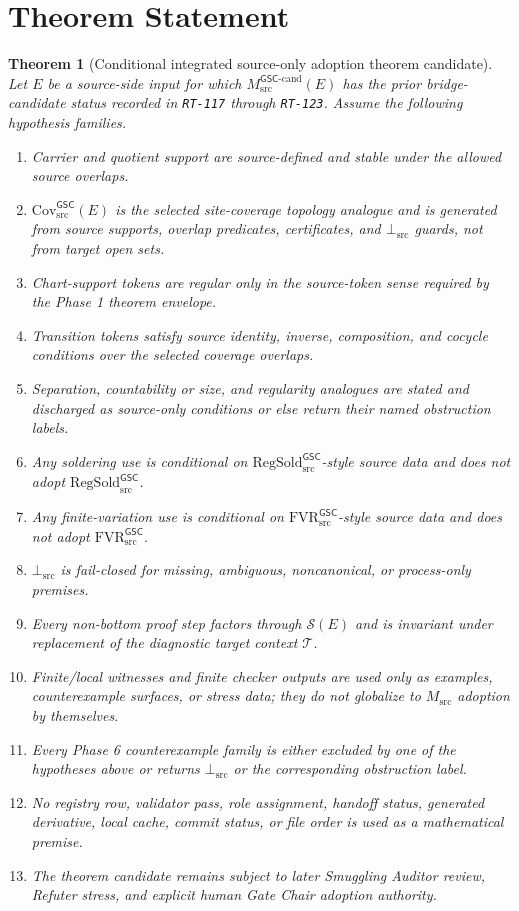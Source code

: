 \documentclass[11pt]{article}
\newcommand{\Msrc}{M_{\mathrm{src}}}
\newcommand{\Mgsccand}{M_{\mathrm{src}}^{\mathsf{GSC}\mbox{-}\mathrm{cand}}}
\newcommand{\RegSold}{\mathrm{RegSold}_{\mathrm{src}}^{\mathsf{GSC}}}
\newcommand{\FVR}{\mathrm{FVR}_{\mathrm{src}}^{\mathsf{GSC}}}
\newcommand{\BottomSrc}{\bot_{\mathrm{src}}}
\newcommand{\CovSrc}{\mathrm{Cov}_{\mathrm{src}}^{\mathsf{GSC}}}
\newcommand{\SourceData}{\mathcal{S}(E)}
\newcommand{\TargetCtx}{\mathcal{T}}
\newtheorem{theorem}{Theorem}
\begin{document}
\section{Theorem Statement}

\begin{theorem}[Conditional integrated source-only adoption theorem candidate]
Let \(E\) be a source-side input for which \(\Mgsccand(E)\) has the prior
bridge-candidate status recorded in \texttt{RT-117} through \texttt{RT-123}.
Assume the following hypothesis families.

\begin{enumerate}[label=\textbf{H\arabic*.}, leftmargin=*]
  \item Carrier and quotient support are source-defined and stable under the
  allowed source overlaps.
  \item \(\CovSrc(E)\) is the selected site-coverage topology analogue and is
  generated from source supports, overlap predicates, certificates, and
  \(\BottomSrc\) guards, not from target open sets.
  \item Chart-support tokens are regular only in the source-token sense
  required by the Phase 1 theorem envelope.
  \item Transition tokens satisfy source identity, inverse, composition, and
  cocycle conditions over the selected coverage overlaps.
  \item Separation, countability or size, and regularity analogues are stated
  and discharged as source-only conditions or else return their named
  obstruction labels.
  \item Any soldering use is conditional on \(\RegSold\)-style source data and
  does not adopt \(\RegSold\).
  \item Any finite-variation use is conditional on \(\FVR\)-style source data
  and does not adopt \(\FVR\).
  \item \(\BottomSrc\) is fail-closed for missing, ambiguous, noncanonical, or
  process-only premises.
  \item Every non-bottom proof step factors through \(\SourceData\) and is
  invariant under replacement of the diagnostic target context \(\TargetCtx\).
  \item Finite/local witnesses and finite checker outputs are used only as
  examples, counterexample surfaces, or stress data; they do not globalize to
  \(\Msrc\) adoption by themselves.
  \item Every Phase 6 counterexample family is either excluded by one of the
  hypotheses above or returns \(\BottomSrc\) or the corresponding obstruction
  label.
  \item No registry row, validator pass, role assignment, handoff status,
  generated derivative, local cache, commit status, or file order is used as a
  mathematical premise.
  \item The theorem candidate remains subject to later Smuggling Auditor
  review, Refuter stress, and explicit human Gate Chair adoption authority.
\end{enumerate}


\end{theorem}
\end{document}
